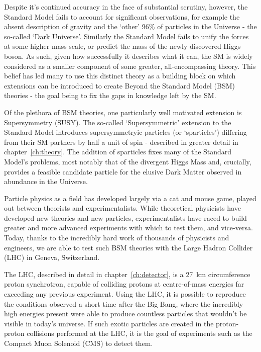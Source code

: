 Despite it's continued accuracy in the face of substantial scrutiny, however,
the Standard Model fails to account for significant observations, for example
the absent description of gravity and the `other' 96\% of particles in the
Universe - the so-called `Dark Universe'. Similarly the Standard Model fails to
unify the forces at some higher mass scale, or predict the mass of
the newly
discovered Higgs boson. As such, given how successfully it describes what it
can, the SM is widely considered
as a smaller component of some greater, all-encompassing theory.
This belief has led many to use this distinct theory as a building
block on which extensions can be introduced to create Beyond the Standard Model
(BSM) theories - the goal being to fix the gaps in knowledge left by the SM.

Of the plethora of BSM theories, one particularly well motivated extension is
Supersymmetry (SUSY). The so-called `Supersymmetric' extension to the Standard
Model introduces supersymmetryic particles (or `sparticles') differing from
their SM partners by half a unit of spin - described in greater detail in
chapter~\ref{ch:theory}. The addition of sparticles fixes
many of the Standard Model's problems, most notably that of the
divergent Higgs Mass and, crucially, provides a feasible
candidate particle for the elusive Dark Matter observed in abundance in the
Universe.

Particle physics as a field has developed largely via a cat and mouse game,
played out between theorists and experimentalists. While theoretical physicists
have
developed new theories and new particles, experimentalists have raced to build
greater and more advanced experiments with which to test them, and vice-versa.
Today, thanks to the incredibly hard work of thousands of physicists and
engineers, we are able to test such BSM theories with the Large
Hadron Collider (LHC) in Geneva, Switzerland.

The LHC, described in detail in chapter~\ref{ch:detector}, is a 27~km
circumference proton synchrotron, capable of colliding protons
at centre-of-mass energies far exceeding any previous experiment.
Using the LHC, it is possible to reproduce the conditions observed a short time
after the Big Bang, where the incredibly high energies present were able to
produce countless particles that wouldn't be visible in today's universe. If
such exotic particles are created in the proton-proton collisions performed at
the LHC, it is the goal of experiments such as the Compact Muon Solenoid (CMS)
to detect them.

